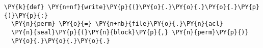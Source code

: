 \begin{Verbatim}[commandchars=\\\{\},codes={\catcode`\$=3\catcode`\^=7\catcode`\_=8},fontsize=\scriptsize]
\PY{k}{def} \PY{n+nf}{write}\PY{p}{(}\PY{o}{.}\PY{o}{.}\PY{o}{.}\PY{p}{)}\PY{p}{:}
  \PY{n}{perm} \PY{o}{=} \PY{n+nb}{file}\PY{o}{.}\PY{n}{acl}
  \PY{n}{seal}\PY{p}{(}\PY{n}{block}\PY{p}{,} \PY{n}{perm}\PY{p}{)}
  \PY{o}{.}\PY{o}{.}\PY{o}{.}
\end{Verbatim}
